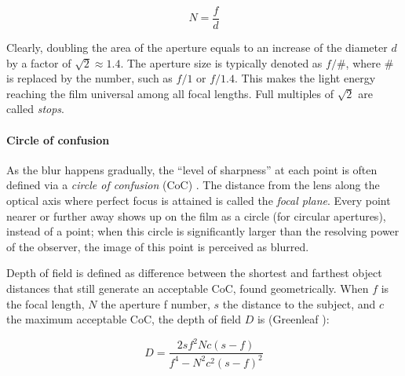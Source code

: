 \begin{equation} \label{eq:fnumber}
	N = \frac{f}{d}
\end{equation}

Clearly, doubling the area of the aperture equals to an increase of the diameter $d$ by a factor of $\sqrt 2 \approx 1.4$.
The aperture size is typically denoted as $f/\#$, where $\#$ is replaced by the number, such as $f/1$ or $f/1.4$.
This makes the light energy reaching the film universal among all focal lengths.
Full multiples of $\sqrt 2$ are called \emph{stops}.
\cite{szeliski10vision}

\paragraph{Circle of confusion}
As the blur happens gradually, the ``level of sharpness'' at each point is often defined via a \emph{circle of confusion} (CoC) \cite{greenleaf1950photographic}.
The distance from the lens along the optical axis where perfect focus is attained is called the \emph{focal plane}.
Every point nearer or further away shows up on the film as a circle (for circular apertures), instead of a point; when this circle is significantly larger than the resolving power of the observer, the image of this point is perceived as blurred.

Depth of field is defined as difference between the shortest and farthest object distances that still generate an acceptable CoC, found geometrically.
When $f$ is the focal length, $N$ the aperture f number, $s$ the distance to the subject, and $c$ the maximum acceptable CoC, the depth of field $D$ is (Greenleaf \cite{greenleaf1950photographic}):

\begin{equation} \label{eq:dof}
	D = \frac{2 s f^2 N c (s - f)} {f^4 - N^2 c^2 (s - f)^2}
\end{equation}



